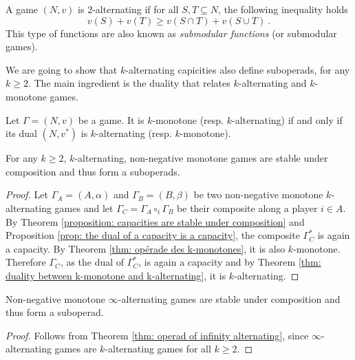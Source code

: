 \documentclass[a4paper,12pt]{amsart}
\begin{document}
\begin{remark}
A game $(N,v)$ is $2$-alternating if for all $S,T \subseteq N$, the following inequality holds
\[
v(S) + v(T) \geq  v(S \cap T) + v(S \cup T)~. 
\]
This type of functions are also known as \textit{submodular functions} (or submodular games). 
\end{remark}

We are going to show that $k$-alternating capicities also define suboperads, for any $k \geq 2$. The main ingredient is the duality that relates $k$-alternating and $k$-monotone games. 

\begin{theorem}\label{thm: duality between k-monotone and k-alternating}
Let $\Gamma = (N,v)$ be a game. It is $k$-monotone (resp. $k$-alternating) if and only if its dual $(N,v^*)$ is $k$-alternating (resp. $k$-monotone). 
\end{theorem}

\begin{theorem}\label{thm: operad of infinity alternating}
For any $k \geq 2$, $k$-alternating, non-negative monotone games are stable under composition and thus form a suboperads.
\end{theorem}

\begin{proof}
Let \(\Gamma_A = (A, \alpha) \) and \(\Gamma_B = (B, \beta)\) be two non-negative monotone $k$-alternating games and let \(\Gamma_C = \Gamma_A \circ_i \Gamma_B\) be their composite along a player \(i \in A\). By Theorem \ref{proposition: capacities are stable under composition} and Proposition \ref{prop: the dual of a capacity is a capacity}, the composite $\Gamma_C^*$ is again a capacity. By Theorem \ref{thm: opérade des k-monotones}, it is also $k$-monotone. Therefore $\Gamma_C$, as the dual of $\Gamma_C^*$, is again a capacity and by Theorem \ref{thm: duality between k-monotone and k-alternating}, it is $k$-alternating. 
\end{proof}

\begin{corollary}
Non-negative monotone $\infty$-alternating games are stable under composition and thus form a suboperad.
\end{corollary}

\begin{proof}
Follows from Theorem \ref{thm: operad of infinity alternating}, since $\infty$-alternating games are $k$-alternating games for all $k \geq 2$.    
\end{proof} 
\end{document}
